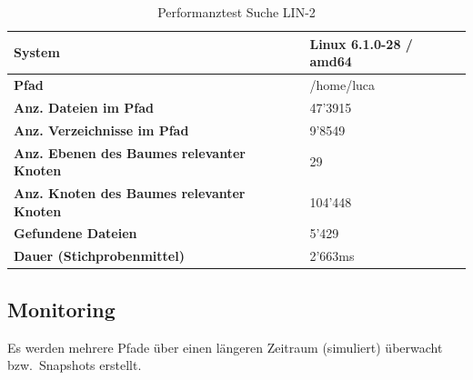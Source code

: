 \documentclass[a4paper,12pt]{report}
\begin{document}
    \begin{table}[h!]
        \centering
        \setlength{\leftmargini}{0.8cm}
        \begin{tabular}{|p{7cm}|p{5cm}|}
            \hline
            \textbf{System}                                            & Linux 6.1.0-28 / amd64 \\ \hline
            \textbf{Pfad}                                              & /home/luca             \\ \hline
            \textbf{Anz. Dateien im Pfad}                              & 47'3915                \\ \hline
            \textbf{Anz. Verzeichnisse im Pfad}                        & 9'8549                 \\ \hline
            \textbf{Anz. Ebenen \newline des Baumes relevanter Knoten} & 29                     \\ \hline
            \textbf{Anz. Knoten \newline des Baumes relevanter Knoten} & 104'448                \\ \hline
            \textbf{Gefundene Dateien}                                 & 5'429                  \\ \hline
            \textbf{Dauer (Stichprobenmittel)}                        & 2'663ms                \\ \hline
        \end{tabular}
        \caption{Performanztest Suche LIN-2}\label{tab:perf-search-lin-2}
    \end{table}

    \clearpage

    \subsection{Monitoring}\label{subsec:monitoring)}
    Es werden mehrere Pfade über einen längeren Zeitraum (simuliert) überwacht bzw.\ Snapshots erstellt.
\end{document}
